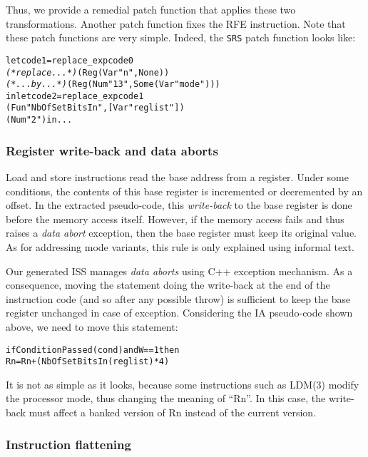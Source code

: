 \documentclass[conference]{ieeeconf}
\begin{document}
Thus, we provide a remedial patch function that applies these two transformations.
 Another patch function fixes the {\stt RFE} instruction. Note that
these patch functions are very simple. Indeed, the {\tt SRS} patch function looks like:

{\small
\begin{alltt}
let code1 = replace_exp code0
{\rm\em (* replace... *)}(Reg (Var "n", None))
\hspace*{1mm} {\rm\em (* ... by... *)} (Reg (Num "13", Some (Var "mode")))
in let code2 = replace_exp code1
        (Fun "NbOfSetBitsIn", [Var "reglist"])
        (Num "2") in...
\end{alltt}
}


\subsubsection{Register write-back and data aborts}
\label{s:writeback}

Load and store instructions read the base address from a register. Under some
conditions, the contents of this base register is incremented or decremented by
an offset. In the extracted pseudo-code, this \emph{write-back} to the base
register is done before the memory access itself. However, if the memory access
fails and thus raises a {\em data abort} exception, then the base register must
keep its original value. As for addressing mode variants, this rule is only
explained using informal text.

Our generated ISS manages {\em data aborts} using C++ exception mechanism. As a
consequence, moving the statement doing the write-back at the end of the
instruction code (and so after any possible {\stt throw}) is sufficient to keep
the base register unchanged in case of exception. Considering the IA pseudo-code
shown above, we need to move this statement:

{\small
\begin{alltt}
if ConditionPassed(cond) and W==1 then
    Rn = Rn+(NbOfSetBitsIn(reglist)*4)
\end{alltt}
}

It is not as simple as it looks, because some instructions such as {\stt LDM(3)}
modify the processor mode, thus changing the meaning of ``{\stt Rn}''. In this
case, the write-back must affect a banked version of {\stt Rn} instead of the
current version.

\subsubsection{Instruction flattening}
\end{document}
